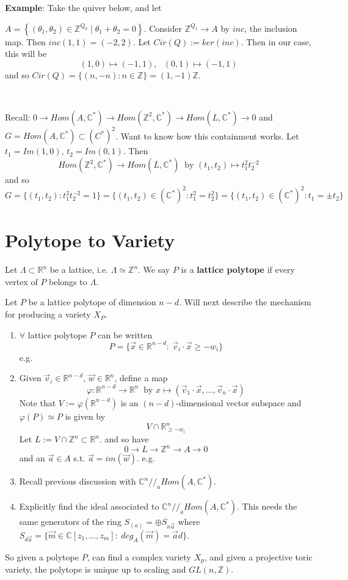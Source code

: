 \documentclass{article}
\newcommand{\C}{\mathbb{C}}
\newcommand{\R}{\mathbb{R}}
\newcommand{\Z}{\mathbb{Z}}
\begin{document}
		\noindent\textbf{Example}: Take the quiver below, and let \\
		\begin{minipage}{0.65\textwidth}
		$A=\left\{(\theta_1,\theta_2)\in\Z^{Q_0}\mid\theta_1+\theta_2=0\right\}$. 
		Consider $\Z^{Q_1}\to A$ by $inc$, the inclusion map. 
		Then $inc(1,1)=(-2,2)$.  Let $Cir(Q):=ker(inc)$. Then in 
		our case, this will be 
		$$ (1,0)\mapsto(-1,1),~~~ (0,1)\mapsto(-1,1)$$
		and so $Cir(Q)=\{(n,-n):n\in\Z\}=(1,-1)\Z$.
		\end{minipage}~\begin{minipage}{0.3\textwidth}
		\end{minipage}
		Recall: $0\to Hom(A,\C^*)\to Hom(\Z^2,\C^*)\to Hom(L,\C^*)\to0$
		and $G= Hom(A,\C^*)\subset(C^*)^2$. Want to know how this containment 
		works. Let $t_1=Im(1,0)$, $t_2=Im(0,1)$. Then 
		$$Hom(\Z^2,\C^*)\to Hom(L,\C^*)~\text{ by }
		(t_1,t_2)\mapsto t_1^2t_2^{-2}$$
		and so $G=\{(t_1,t_2):t_1^2t_2^{-2}=1\}=
		\{(t_1,t_2)\in(\C^*)^2:t_1^2=t_2^2\}=\{(t_1,t_2)\in(\C^*)^2:t_1=\pm t_2\}$

	\section{Polytope to Variety}
	Let $\Lambda\subset\R^n$ be a lattice, i.e. $\Lambda\simeq\Z^n$. 
	We say $P$ is a \textbf{lattice polytope} if every vertex of $P$ 
	belongs to $\Lambda$. 

	Let $P$ be a lattice polytope of dimension $n-d$. Will next describe 
	the mechanism for producing a variety $X_P$. 

	\begin{enumerate}
		\item $\forall$ lattice polytope $P$ can be written 
		$$P=\{\vec{x}\in\R^{n-d}:~\vec{v}_i\cdot\vec{x}\ge-w_i\}$$
		e.g. 
	\item Given $\vec{v}_i\in\R^{n-d}$, $\vec{w}\in\R^n$, define a map 
		$$\varphi:\R^{n-d}\to\R^n~\text{ by } x\mapsto(
		\vec{v}_1\cdot\vec{x},...,\vec{v}_n\cdot\vec{x})$$
		Note that $V:=\varphi(\R^{n-d})$ is an $(n-d)$-dimensional 
		vector subspace and $\varphi(P)\simeq P$ is given by 
		$$V\cap\R^n_{\ge-w_i}$$
		Let $L:=V\cap\Z^n\subset\R^n$. 
		and so have $$0\to L\to\Z^n\to A\to0$$ and an 
		$\vec{a}\in A$ s.t. $\vec{a}=im(\vec{w})$. 
		e.g. 
	\item Recall previous discussion with $\C^n//_a Hom(A,\C^*)$. 
	\item Explicitly find the ideal associated to $\C^n//_aHom(A,\C^*)$. 
	This needs the same generators of the ring $S_{(a)}=\oplus S_{n\vec{a}}$
	where $S_{d\vec{a}}=\{\vec{m}\in\C[z_1,...,z_m]:~deg_A(\vec{m})=\vec{a}d\}$. 
	\end{enumerate}
	So given a polytope $P$, can find a complex variety $X_p$, and given 
	a projective toric variety, the polytope is unique up to scaling and 
	$GL(n,\Z)$. 
\end{document}
